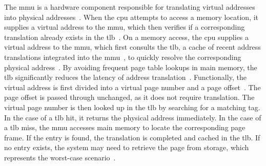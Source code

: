     The \gls{mmu} is a hardware component responsible for translating virtual addresses 
    into physical addresses~\cite{blogVirtToPhys}. When the \gls{cpu} attempts to access a memory location, 
    it supplies a virtual address to the \gls{mmu}, which then verifies if a corresponding 
    translation already exists in the \gls{tlb}~\cite{docPageTables}.
    On a memory access, the \gls{cpu} supplies a virtual address to the \gls{mmu}, which first 
    consults the \gls{tlb}, a cache of recent address translations integrated into the 
    \gls{mmu}~\cite{webVirtualMemoryTranslation}, to quickly resolve the corresponding physical address~\cite{docPageTables}. By avoiding 
    frequent page table lookups in main memory, the \gls{tlb} significantly reduces the 
    latency of address translation~\cite{webVirtualMemoryTranslation, blogVirtToPhys}.
    Functionally, the virtual address is first divided into a virtual page number 
    and a page offset~\cite{blogVirtToPhys}. The page offset is passed through unchanged, as it does 
    not require translation. The virtual page number is then looked up in the \gls{tlb} by 
    searching for a matching tag. In the case of a \gls{tlb} hit, it returns the physical address 
    immediately. In the case of a \gls{tlb} miss, the \gls{mmu} accesses main memory 
    to locate the corresponding page frame. If the entry is found, the translation 
    is completed and cached in the \gls{tlb}. If no entry exists, the system may need to 
    retrieve the page from storage, which represents the worst-case 
    scenario~\cite{blogVirtToPhys}.

